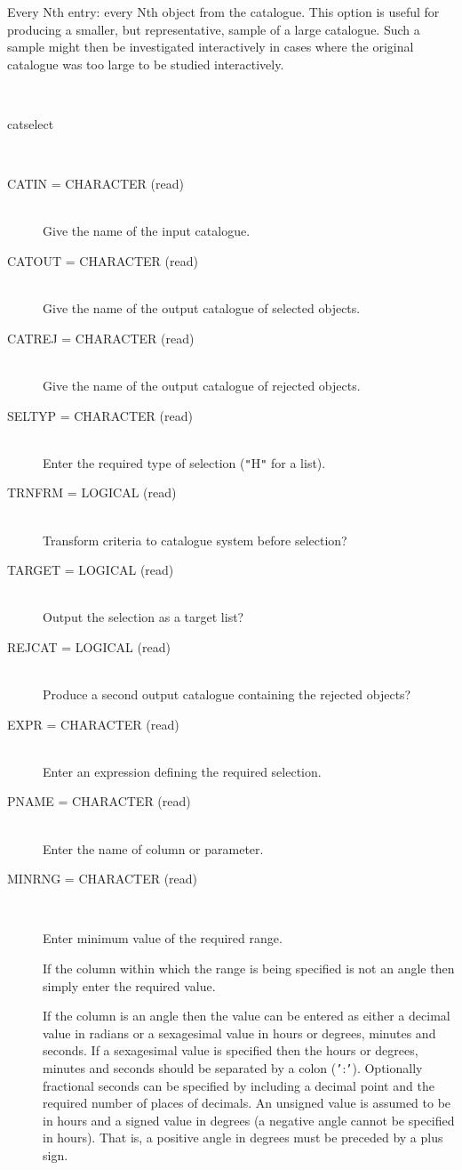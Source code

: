 \documentclass[twoside,11pt]{article}
\renewcommand{\_}{\texttt{\symbol{95}}}
\newcommand{\sstusage}[1]{\item[Usage:] \mbox{}
\\[1.3ex]{\raggedright \ssttt #1}}
\newcommand{\sstparameters}[1]{
   \item[Parameters:] \mbox{} \\
   \vspace{-3.5ex}
   \begin{description}
      #1
   \end{description}
}
\newcommand{\sstsubsection}[1]{ \item[{#1}] \mbox{} \\}
\newcommand{\sstusage}[1]{\item[Usage:]
      \begin{description}
         {\ssttt #1}
      \end{description}
      \\
   }
\newcommand{\sstparameters}[1]{
      \item[Parameters:] \\
      \begin{description}
         #1
      \end{description}
      \\
   }
\newcommand{\sstsubsection}[1]{\item[{#1}]}
\begin{document}
\begin{htmlonly}
{{      Every Nth entry: every Nth object from the catalogue.  This option
        is useful for producing a smaller, but representative, sample of
        a large catalogue.  Such a sample might then be investigated
        interactively in cases where the original catalogue was too
        large to be studied interactively.
   }
   \sstusage{
      catselect
   }
   \sstparameters{
      \sstsubsection{
         CATIN  = CHARACTER (read)
      }{
         Give the name of the input catalogue.
      }
      \sstsubsection{
         CATOUT  =  CHARACTER (read)
      }{
         Give the name of the output catalogue of selected objects.
      }
      \sstsubsection{
         CATREJ  =  CHARACTER (read)
      }{
         Give the name of the output catalogue of rejected objects.
      }
      \sstsubsection{
         SELTYP  =  CHARACTER (read)
      }{
         Enter the required type of selection ({\tt "}H{\tt "} for a list).
      }
      \sstsubsection{
         TRNFRM  =  LOGICAL (read)
      }{
         Transform criteria to catalogue system before selection?
      }
      \sstsubsection{
         TARGET  =  LOGICAL (read)
      }{
         Output the selection as a target list?
      }
      \sstsubsection{
         REJCAT  =  LOGICAL (read)
      }{
         Produce a second output catalogue containing the rejected objects?
      }
      \sstsubsection{
         EXPR  =  CHARACTER (read)
      }{
         Enter an expression defining the required selection.
      }
      \sstsubsection{
         PNAME  =  CHARACTER (read)
      }{
         Enter the name of column or parameter.
      }
      \sstsubsection{
         MINRNG  =  CHARACTER (read)
      }{
         Enter minimum value of the required range.

         If the column within which the range is being specified is
         not an angle then simply enter the required value.

         If the column is an angle then the value can be entered as
         either a decimal value in radians or a sexagesimal value in
         hours or degrees, minutes and seconds.  If a sexagesimal value
         is specified then the hours or degrees, minutes and seconds
         should be separated by a colon ({\tt '}:{\tt '}).  Optionally fractional
         seconds can be specified by including a decimal point and the
         required number of places of decimals.  An unsigned value is
         assumed to be in hours and a signed value in degrees (a
         negative angle cannot be specified in hours).  That is,
         a positive angle in degrees must be preceded by a plus sign.

}}}
\end{htmlonly}
\end{document}
